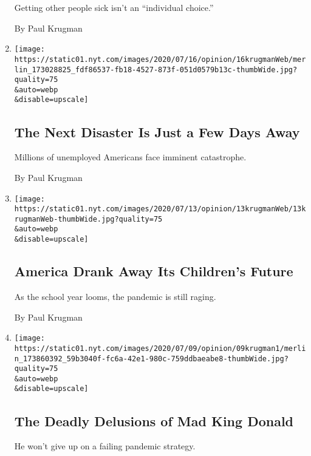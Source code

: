 \begin{enumerate}
  Getting other people sick isn't an ``individual choice.''

  By Paul Krugman
\item
  \href{/2020/07/16/opinion/coronavirus-economy-unemployment.html}{}

  \texttt{[image: https://static01.nyt.com/images/2020/07/16/opinion/16krugmanWeb/merlin\_173028825\_fdf86537-fb18-4527-873f-051d0579b13c-thumbWide.jpg?quality=75\\\&auto=webp\\\&disable=upscale]}

  \hypertarget{the-next-disaster-is-just-a-few-days-away}{%
  \subsection{The Next Disaster Is Just a Few Days
  Away}\label{the-next-disaster-is-just-a-few-days-away}}

  Millions of unemployed Americans face imminent catastrophe.

  By Paul Krugman
\item
  \href{/2020/07/13/opinion/coronavirus-schools-bars.html}{}

  \texttt{[image: https://static01.nyt.com/images/2020/07/13/opinion/13krugmanWeb/13krugmanWeb-thumbWide.jpg?quality=75\\\&auto=webp\\\&disable=upscale]}

  \hypertarget{america-drank-away-its-childrens-future}{%
  \subsection{America Drank Away Its Children's
  Future}\label{america-drank-away-its-childrens-future}}

  As the school year looms, the pandemic is still raging.

  By Paul Krugman
\item
  \href{/2020/07/09/opinion/trump-coronavirus.html}{}

  \texttt{[image: https://static01.nyt.com/images/2020/07/09/opinion/09krugman1/merlin\_173860392\_59b3040f-fc6a-42e1-980c-759ddbaeabe8-thumbWide.jpg?quality=75\\\&auto=webp\\\&disable=upscale]}

  \hypertarget{the-deadly-delusions-of-mad-king-donald}{%
  \subsection{The Deadly Delusions of Mad King
  Donald}\label{the-deadly-delusions-of-mad-king-donald}}

  He won't give up on a failing pandemic strategy.


\end{enumerate}
